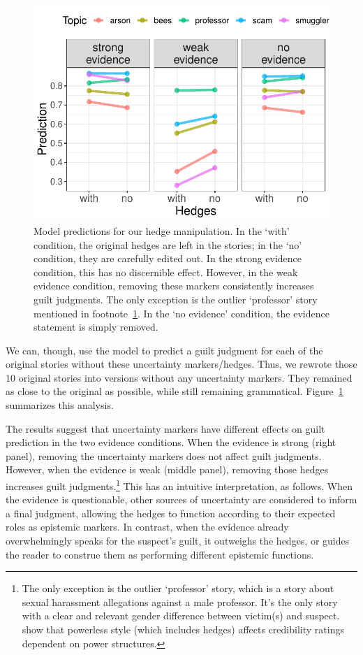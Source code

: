 \documentclass[11pt,a4paper]{article}
\begin{document}
\begin{figure}
  \includegraphics[width=1\linewidth]{graphs/hedges.pdf}
  \caption{Model predictions for our hedge manipulation. In the `with' condition,
    the original hedges are left in the stories; in the `no' condition, they are
    carefully edited out. In the strong evidence condition, this has no discernible
    effect. However, in the weak evidence condition, removing these markers
    consistently increases guilt judgments. 
    The only exception is the outlier `professor' story mentioned in footnote~\ref{fn:prof}. 
    In the `no evidence' condition, the evidence statement is simply removed.}
  \label{fig:hedges}
\end{figure}


We can, though, use the model to predict a guilt judgment for each of the original stories without these uncertainty markers/hedges. Thus, we rewrote those 10 original stories into versions without any uncertainty markers. They remained as close to the original as possible, while still remaining grammatical. Figure~\ref{fig:hedges} summarizes this analysis.

The results suggest that uncertainty markers have different effects on guilt prediction in the two evidence conditions. When the evidence is strong (right panel), removing the uncertainty markers does not affect guilt judgments. However, when the evidence is weak (middle panel), removing those hedges increases guilt judgments.\footnote{The only exception is the outlier `professor' story, which is a story about sexual harassment allegations against a male professor. It's the only story with a clear and relevant gender difference between victim(s) and suspect. \citet{Erickson-etal:1978} show that powerless style (which includes hedges) affects credibility ratings dependent on power structures.\label{fn:prof}} This has an intuitive interpretation, as follows. When the evidence is questionable, other sources of uncertainty are considered to inform a final judgment, allowing the hedges to function according to their expected roles as epistemic markers.
In contrast, when the evidence already overwhelmingly speaks for the suspect's guilt, it outweighs the hedges,  or guides the reader to construe them as performing different epistemic functions. 
\end{document}
